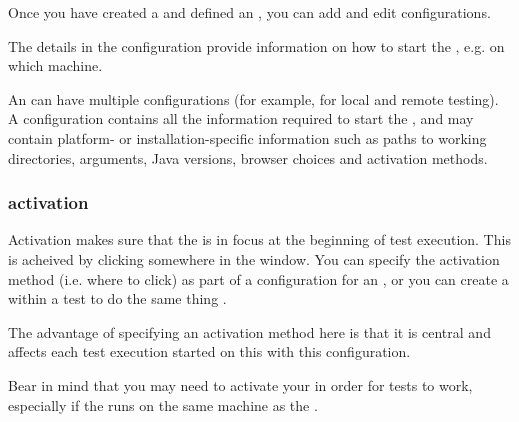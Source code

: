 


Once you have created a \gdproject{}  and defined an \gdaut{} , you can add and edit \gdaut{} configurations. 

The details in the \gdaut{} configuration provide information on how to start the \gdaut{}, e.g. on which machine. 

An \gdaut{} can have multiple configurations (for example, for local and remote testing). A configuration contains all the information required to start the \gdaut{}, and may contain platform- or installation-specific information such as paths to working directories, \gdaut{} arguments, Java versions, browser choices and activation methods. 


\subsubsection{\gdaut{} activation}
\label{TasksAUTActivation}

Activation makes sure that the  \gdaut{} is in focus at the beginning of test execution. This is acheived by clicking somewhere in the \gdaut{} window. You can specify the activation method (i.e. where to click) as part of a configuration for an \gdaut{}, or you can create a \gdstep{} within a test to do the same thing . 

The advantage of specifying an activation method here is that it is central and affects each test execution started on this \gdaut{} with this configuration. 

Bear in mind that you may need to activate your \gdaut{} in order for tests to work, especially if the \gdaut{} runs on the same machine as the \ite{}. 
